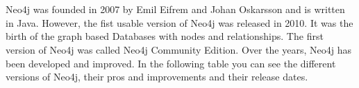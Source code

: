 
\section{} \label{sec:history}
Neo4j was founded in 2007 by Emil Eifrem and Johan Oskarsson and is written in Java.
However, the fist usable version of Neo4j was released in 2010.
It was the birth of the graph based Databases with nodes and relationships.
The first version of Neo4j was called Neo4j Community Edition.
Over the years, Neo4j has been developed and improved.
In the following table you can see the different versions of Neo4j, their pros and improvements and their release dates.
